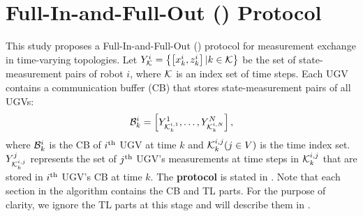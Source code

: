\section{Full-In-and-Full-Out (\proto) Protocol}\label{sec:\proto}	
	This study proposes a Full-In-and-Full-Out (\proto) protocol for measurement exchange in time-varying topologies.
	Let $Y^i_{\mathcal{K}}=\left\lbrace \left[x^i_k,z^i_k\right]|k\in \mathcal{K}\right\rbrace$ 
	be the set of state-measurement pairs of robot $i$, where $\mathcal{K}$ is an index set of time steps.
	Each UGV contains a communication buffer (CB) that stores state-measurement pairs 
	of all UGVs:
	\begin{equation*}		
		\mathcal{B}^i_k=\left[ Y^1_{\mathcal{K}^{i,1}_k},\dots,Y^N_{\mathcal{K}^{i,N}_k}\right],
	\end{equation*}
	where $\mathcal{B}^i_k$ is the CB of $i^\text{th}$ UGV at time $k$ and $\mathcal{K}^{i,j}_k (j\in V)$ is the time index set.
	$Y^j_{\mathcal{K}^{i,j}_k}$ represents the set of $j^\text{th}$ UGV's measurements at time steps in $\mathcal{K}^{i,j}_k$ that are stored in $i^\text{th}$ UGV's CB at time $k$.
	The \textbf{{\proto} protocol} is stated in .
	Note that each section in the algorithm contains the CB and TL parts.
	For the purpose of clarity, we ignore the TL parts at this stage and will describe them in .
	
